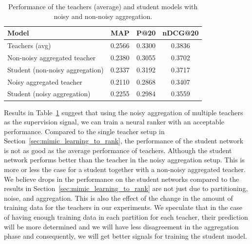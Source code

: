 \begin{table}[t]
\centering
\caption{\label{tbl_res2}Performance of the teachers (average) and student models with noisy and non-noisy aggregation.}
\vspace{5pt}
\begin{adjustbox}{max width=\textwidth}
\begin{tabular}{l c c c}
\toprule
 \bf Model & \textbf{MAP} & \textbf{P@20} & \textbf{nDCG@20} 
\\ \midrule
{Teachers (avg)} 
& 0.2566 & 0.3300 & 0.3836
\\ \midrule
{Non-noisy aggregated teacher} 
& 0.2380 & 0.3055 & 0.3702 
\\
{Student \small{(non-noisy aggregation)}} 
& 0.2337 & 0.3192 & 0.3717
\\ \midrule 
{Noisy aggregated teacher} 
& 0.2110 & 0.2868 & 0.3407 
\\
{Student \small{(noisy aggregation)}} 
& 0.2255 & 0.2984 & 0.3559 
\\ \bottomrule
\end{tabular}
\end{adjustbox}
\end{table}

Results in Table~\ref{tbl_res2} suggest that using the noisy aggregation of multiple teachers as the supervision signal, we can train a neural ranker with an acceptable performance.
%
Compared to the single teacher setup in Section~\ref{sec:mimic_learning_to_rank}, the performance of the student network is not as good as the average performance of teachers. Although the student network performs better than the teacher in the noisy aggregation setup. This is more or less the case for a student together with a non-noisy aggregated teacher.
% 
We believe drops in the performance on the student networks compared to the results in Section~\ref{sec:mimic_learning_to_rank} are not just due to partitioning, noise, and aggregation. This is also the effect of the change in the amount of training data for the teachers in our experiments. We speculate that in the case of having enough training data in each partition for each teacher, their prediction will be more determined and we will have less disagreement in the aggregation phase and consequently, we will get better signals for training the student model.


